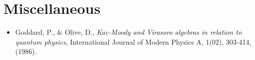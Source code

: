 \section*{Miscellaneous}
\begin{itemize}
    \item Goddard, P., \& Olive, D., \textit{Kac-Moody and Virasoro algebras in relation to quantum physics}, International Journal of Modern Physics A, 1(02), 303-414, (1986).
\end{itemize}